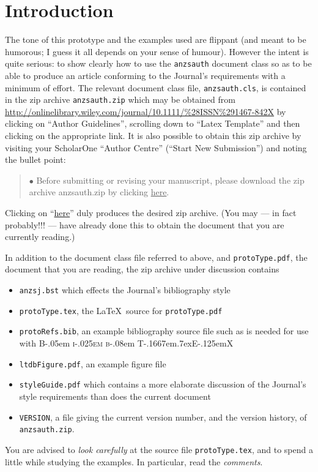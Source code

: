 \documentclass[times, doublespace]{anzsauth}
\newcommand\BibTeX{{\rmfamily B\kern-.05em \textsc{i\kern-.025em b}\kern-.08em
T\kern-.1667em\lower.7ex\hbox{E}\kern-.125emX}}
\begin{document}
\maketitle
\section{Introduction}
\label{sec:intro}
The tone of this prototype and the examples used are flippant
(and meant to be humorous; I guess it all depends on your sense
of humour).  However the intent is quite serious:  to show
clearly how to use the \texttt{anzsauth} document class so as
to be able to produce an article conforming to the Journal's
requirements with a minimum of effort.  The relevant document
class file, \texttt{anzsauth.cls}, is contained in the zip archive
\texttt{anzsauth.zip} which may be obtained from\\
{\small
\url{http://onlinelibrary.wiley.com/journal/10.1111/%28ISSN%291467-842X}
}
\noindent
by clicking on ``Author Guidelines'', scrolling down to ``Latex
Template'' and then clicking on the appropriate link.  It is also
possible to obtain this zip archive by visiting your ScholarOne
``Author Centre'' (``Start New Submission'') and noting the bullet
point:
\begin{quote}
$\bullet$ Before submitting or revising your manuscript, please
download the zip archive anzsauth.zip by clicking \underline{here}.
\end{quote}
Clicking on ``\underline{here}'' duly produces the desired zip
archive.  (You may --- in fact probably!!! --- have already done
this to obtain the document that you are currently reading.)

In addition to the document class file referred to above, and
\texttt{protoType.pdf}, the document that you are reading, the zip
archive under discussion contains
\begin{itemize}
\item \texttt{anzsj.bst} which effects the Journal's bibliography
style
\item \texttt{protoType.tex}, the \LaTeX\ source for \texttt{protoType.pdf}
\item \texttt{protoRefs.bib}, an example bibliography source file such
as is needed for use with \BibTeX
\item \texttt{ltdbFigure.pdf}, an example figure file
\item \texttt{styleGuide.pdf} which contains a more elaborate discussion
of the Journal's style requirements than does the current document
\item \texttt{VERSION}, a file giving the current version number,
and the version history, of \texttt{anzsauth.zip}.
\end{itemize}
You are advised to \emph{look carefully} at the source file
\texttt{protoType.tex}, and to spend a little while studying the
examples.  In particular, read the \emph{comments}.
\end{document}
